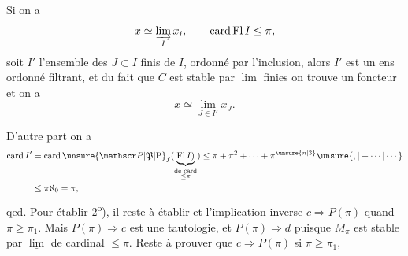 Si on a
\[
x\simeq\varinjlim_I x_i,\qquad \operatorname{card}\mathrm{Fl}\,I\leq\pi,
\]
soit $I'$ l'ensemble des \uline{} $J\subset I$ finis de $I$, ordonné par l'inclusion, alors $I'$ est un ens ordonné filtrant, et du fait que $C$ est stable par $\underline{\lim}$ finies on trouve un foncteur
et on a
\[
x\simeq\lim_{J\in I'}x_J.
\]

D'autre part on a
\[
\begin{aligned}
\operatorname{card}I'&=\operatorname{card}\unsure{\mathscr P|\mathfrak P|\mathrm P}_f(\underbrace{\mathrm{Fl}\,I)}_{\substack{\text{de card}\\\leq\pi}})\leq\pi+\pi^2+\cdots+\pi^{\unsure{n|3}}\unsure{,|+\cdots|\cdots}\\
&\leq\pi\aleph_0=\pi,
\end{aligned}
\]
qed. Pour établir 2\textsuperscript{o}), il reste à établir
et l'implication inverse $c\Rightarrow P(\pi)$ quand $\pi\geq\pi_1$. Mais $P(\pi)\Rightarrow c$ est une tautologie, et $P(\pi)\Rightarrow d$ puisque $M_\pi$ est stable par $\underline{\lim}$ de cardinal $\leq\pi$. Reste à prouver que $c\Rightarrow P(\pi)$ si $\pi\geq\pi_1$,

